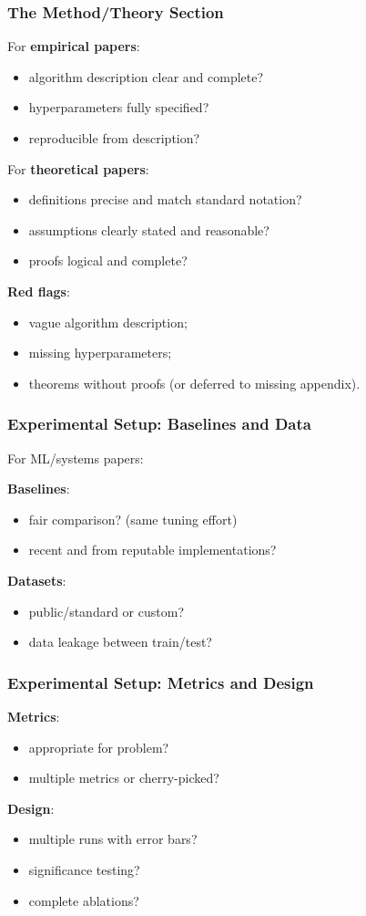 \documentclass[]{beamer}
\begin{document}
\begin{frame}[fragile]
\frametitle{The Method/Theory Section}
For \textbf{empirical papers}:
\begin{itemize}
  \item algorithm description clear and complete?
  \item hyperparameters fully specified?
  \item reproducible from description?
\end{itemize}

For \textbf{theoretical papers}:
\begin{itemize}
  \item definitions precise and match standard notation?
  \item assumptions clearly stated and reasonable?
  \item proofs logical and complete?
\end{itemize}

\textbf{Red flags}:
\begin{itemize}
  \item vague algorithm description;
  \item missing hyperparameters;
  \item theorems without proofs (or deferred to missing appendix).
\end{itemize}

\end{frame}

\begin{frame}[fragile]
\frametitle{Experimental Setup: Baselines and Data}
For ML/systems papers:

\textbf{Baselines}:
\begin{itemize}
  \item fair comparison? (same tuning effort)
  \item recent and from reputable implementations?
\end{itemize}

\textbf{Datasets}:
\begin{itemize}
  \item public/standard or custom?
  \item data leakage between train/test?
\end{itemize}

\end{frame}

\begin{frame}[fragile]
\frametitle{Experimental Setup: Metrics and Design}
\textbf{Metrics}:
\begin{itemize}
  \item appropriate for problem?
  \item multiple metrics or cherry-picked?
\end{itemize}

\textbf{Design}:
\begin{itemize}
  \item multiple runs with error bars?
  \item significance testing?
  \item complete ablations?
\end{itemize}

\end{frame}
\end{document}
